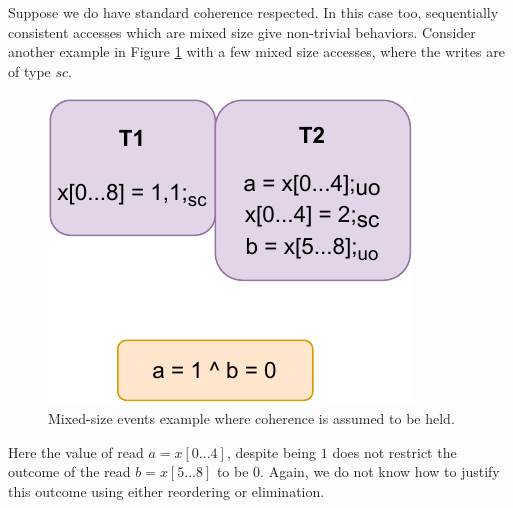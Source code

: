         Suppose we do have standard coherence respected. 
        In this case too, sequentially consistent accesses which are mixed size give non-trivial behaviors.
        Consider another example in Figure \ref{crit:coherence_mixed} with a few mixed size accesses, where the writes are of type $sc$.
        \begin{figure}[H]
            \centering
            \includegraphics[scale=0.7]{7.ConclusionFutureWork/CoherenceMixed.pdf}
            \caption{Mixed-size events example where coherence is assumed to be held.}
            \label{crit:coherence_mixed}
        \end{figure}

        Here the value of read $a=x[0...4]$, despite being $1$ does not restrict the outcome of the read $b=x[5...8]$ to be $0$. 
        Again, we do not know how to justify this outcome using either reordering or elimination. 
